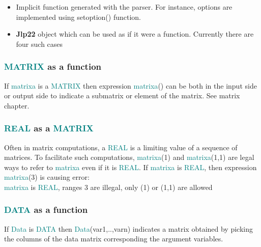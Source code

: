 {\begin{itemize}
\item Implicit function generated with the parser. For instance, options are implemented using 
\textcolor{VioletRed}{setoption}() function. 
\item \textbf{Jlp22} object which can be used as if it were a function. Currently there 
are four such cases 
\end{itemize} 
\subsubsection{\textcolor{teal}{MATRIX} as a function} 
\label{matrixfunc} 
If \textcolor{teal}{matrixa} is a \textcolor{teal}{MATRIX} then expression \textcolor{teal}{matrixa}() can be both in the input side or output side to indicate 
a submatrix or element of the matrix. See matrix chapter. 
\subsubsection{\textcolor{teal}{REAL} as a \textcolor{teal}{MATRIX}} 
\label{realmatrix} 
Often in matrix computations, a \textcolor{teal}{REAL} is a limiting value of a sequence of matrices. 
To facilitate such computations, \textcolor{teal}{matrixa}(1) and \textcolor{teal}{matrixa}(1,1) are legal ways to refer to \textcolor{teal}{matrixa} even if it is \textcolor{teal}{REAL}. 
If \textcolor{teal}{matrixa} is \textcolor{teal}{REAL}, then expression \textcolor{teal}{matrixa}(3) is causing error:\\ 
\textcolor{teal}{matrixa} is \textcolor{teal}{REAL}, ranges            3  are illegal, only (1) or (1,1) are allowed 
\subsubsection{\textcolor{teal}{DATA} as a function} 
\label{datafunc} 
If \textcolor{teal}{Data} is  \textcolor{teal}{DATA} then \textcolor{teal}{Data}(var1,..,varn) indicates a matrix obtained by picking 
the columns of the data matrix corresponding the argument variables. 
}

